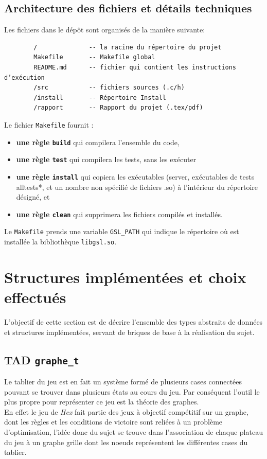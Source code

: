 \documentclass[a4paper,10pt]{article}
\begin{document}
\subsection{Architecture des fichiers et détails techniques}
Les fichiers dans le dépôt sont organisés de la manière suivante:\\
\begin{center}
    
    \begin{verbatim}
        /              -- la racine du répertoire du projet
        Makefile       -- Makefile global
        README.md      -- fichier qui contient les instructions d’exécution
        /src           -- fichiers sources (.c/h)
        /install       -- Répertoire Install 
        /rapport       -- Rapport du projet (.tex/pdf)
    \end{verbatim}
        
\end{center}

Le fichier \texttt{Makefile} fournit :
\begin{itemize}
    \item \textbf{une règle \texttt{build}} qui compilera l'ensemble du code,
    \item \textbf{une règle \texttt{test}} qui compilera les tests, sans les exécuter
    \item \textbf{une règle \texttt{install}} qui copiera les exécutables (server, exécutables de tests alltests*, et un nombre non spécifié de fichiers .so) à l'intérieur du répertoire désigné, et
    \item \textbf{une règle \texttt{clean}} qui supprimera les fichiers compilés et installés.
\end{itemize}

Le \texttt{Makefile} prends une variable \texttt{GSL\_PATH} qui indique le répertoire où est installée la bibliothèque \texttt{libgsl.so}.
\section{Structures implémentées et choix effectués}
L'objectif de cette section est de décrire l'ensemble des types abstraits de données et structures implémentées, servant de briques de base à la réalisation du sujet.
\subsection{TAD \texttt{graphe\_t}}
Le tablier du jeu est en fait un système formé de plusieurs cases connectées pouvant se trouver dans plusieurs états au cours du jeu. Par conséquent l'outil le plus propre pour représenter ce jeu est la théorie des graphes.\\
En effet le jeu de \emph{Hex} fait partie des jeux à objectif compétitif sur un graphe, dont les règles et les conditions de victoire sont reliées à un problème d'optimisation, l'idée donc du sujet se trouve dans l'association de chaque plateau du jeu à un graphe grille dont les noeuds représentent les différentes cases du tablier.\\
\end{document}
